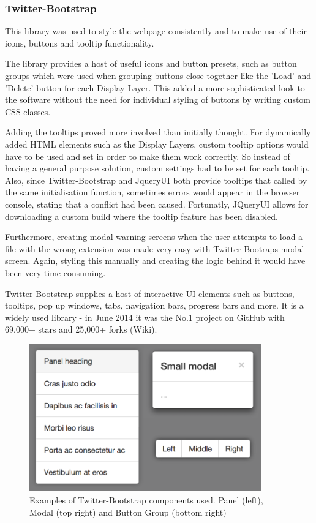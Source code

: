 \documentclass[a4paper,11pt,twoside]{article}
\begin{document}
\subsubsection{Twitter-Bootstrap}

This library was used to style the webpage consistently and to make use of their icons, buttons and tooltip functionality.

The library provides a host of useful icons and button presets, such as button groups which were used when grouping buttons close together like the 'Load' and 'Delete' button for each Display Layer. This added a more sophisticated look to the software without the need for individual styling of buttons by writing custom CSS classes.

Adding the tooltips proved more involved than initially thought. For dynamically added HTML elements such as the Display Layers, custom tooltip options would have to be used and set in order to make them work correctly. So instead of having a general purpose solution, custom settings had to be set for each tooltip. Also, since Twitter-Bootstrap and JqueryUI both provide tooltips that called by the same initialisation function, sometimes errors would appear in the browser console, stating that a conflict had been caused. Fortunatly, JQueryUI allows for downloading a custom build where the tooltip feature has been disabled.

Furthermore, creating modal warning screens when the user attempts to load a file with the wrong extension was made very easy with Twitter-Bootraps modal screen. Again, styling this manually and creating the logic behind it would have been very time consuming.

Twitter-Bootstrap supplies a host of interactive UI elements such as buttons, tooltips, pop up windows, tabs, navigation bars, progress bars and more. It is a widely used library - in June 2014 it was the No.1 project on GitHub with 69,000+ stars and 25,000+ forks (Wiki).


\begin{figure}[ht!]
\centering
\includegraphics[width=100mm]{graphics/twitterBootstrap_01.png}
\caption{Examples of Twitter-Bootstrap components used. Panel (left), Modal (top right) and Button Group (bottom right)}
\label{fig:UIdesign1}
\end{figure}
\end{document}
